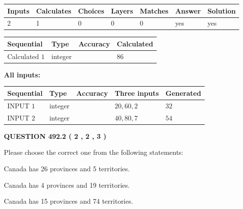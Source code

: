 \documentclass[12pt]{article}
\begin{document}
   
\noindent\begin{tabular}{|l|l|l|l|l|l|l|}
 \hline
Inputs & Calculates & Choices & Layers & Matches & Answer & Solution \\ \hline
 2  & 
 1  & 
 0
  & 
 0  & 
 0  & 
  yes & 
  yes 
  \\ \hline
 \end{tabular}
   
   
   
   
\noindent{}
   
   
  
  
\noindent\begin{tabular}{|l|l|l|l|}
\hline
 Sequential & Type & Accuracy & Calculated \\ 
\hline
 
 
  Calculated $  1 $ & integer &  & 
  $ 86 $ 
 \\  \hline  
 \end{tabular}
   
   
   
   
\noindent\vspace{0.1in}\hspace{-0.08in} {\textbf{\Large{All inputs: }}}
   
   
  
  
\noindent\begin{tabular}{|l|l|l|l|l|}
\hline
 Sequential & Type & Accuracy & Three inputs & Generated \\ 
\hline
 
 
  INPUT $  1 $ & integer &  & $
 20
 , 
 60
 , 
 2
 $ & $ 32 $ 
 \\  \hline  
 
 
  INPUT $  2 $ & integer &  & $
 40
 , 
 80
 , 
 7
 $ & $ 54 $ 
 \\  \hline  
 \end{tabular}
   
   
  
\vspace{0.2in}
  
{\textbf{\Large{QUESTION
492.2 
 ( 2 , 2 , 3 )
}}}
  
  
Please choose the correct one from the following statements:
 
 
Canada has  26 provinces and  5 territories.
 
 
Canada has   4 provinces and  19 territories.
 
 
Canada has  15 provinces and  74 territories.
 
\end{document}
